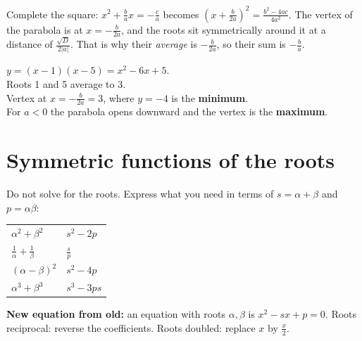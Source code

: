 \documentclass[11pt,a4paper,openany]{report}
\begin{document}
\begin{why}
Complete the square: $x^2+\frac bax=-\frac ca$ becomes $\left(x+\frac b{2a}\right)^2=\frac{b^2-4ac}{4a^2}$. The vertex of the parabola is at $x=-\frac b{2a}$, and the roots sit symmetrically around it at a distance of $\frac{\sqrt D}{2|a|}$. That is why their \emph{average} is $-\frac b{2a}$, so their sum is $-\frac ba$.
\end{why}

\begin{center}
\quad
\begin{minipage}[b]{6.8cm}\small
$y=(x-1)(x-5)=x^2-6x+5$.\\ Roots 1 and 5 average to 3.\\ Vertex at $x=-\frac{b}{2a}=3$, where $y=-4$ is the \textbf{minimum}.\\ For $a<0$ the parabola opens downward and the vertex is the \textbf{maximum}.\\[6pt]
\end{minipage}
\end{center}

\section{Symmetric functions of the roots}
Do not solve for the roots. Express what you need in terms of $s=\alpha+\beta$ and $p=\alpha\beta$:
\begin{center}
\begin{tabular}{ll}
\toprule
$\alpha^2+\beta^2$ & $s^2-2p$\\
$\frac1\alpha+\frac1\beta$ & $\frac sp$\\
$(\alpha-\beta)^2$ & $s^2-4p$\\
$\alpha^3+\beta^3$ & $s^3-3ps$\\
\bottomrule
\end{tabular}
\end{center}
\textbf{New equation from old:} an equation with roots $\alpha,\beta$ is $x^2-sx+p=0$. Roots reciprocal: reverse the coefficients. Roots doubled: replace $x$ by $\frac x2$.
\end{document}

